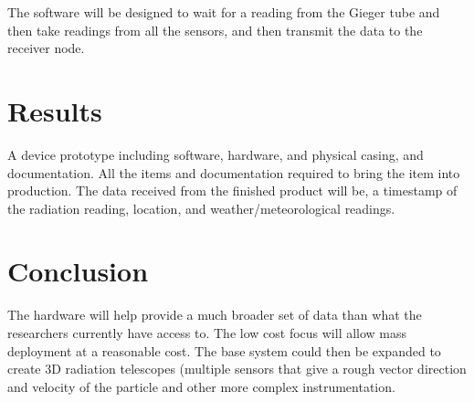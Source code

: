 \documentclass[10pt]{Article}
\begin{document}
The software will be designed to wait for a reading from the Gieger tube and then take readings from all the sensors, and then transmit the data to the receiver node.

\section{Results}
A device prototype including software, hardware, and physical casing, and documentation. All the items and documentation required to bring the item into production. The data received from the finished product will be, a timestamp of the radiation reading, location, and weather/meteorological readings.

\section{Conclusion}
The hardware will help provide a much broader set of data than what the researchers currently have access to. The low cost focus will allow mass deployment at a reasonable cost. The base system could then be expanded to create 3D radiation telescopes (multiple sensors that give a rough vector direction and velocity of the particle and other more complex instrumentation. 
\end{document}
